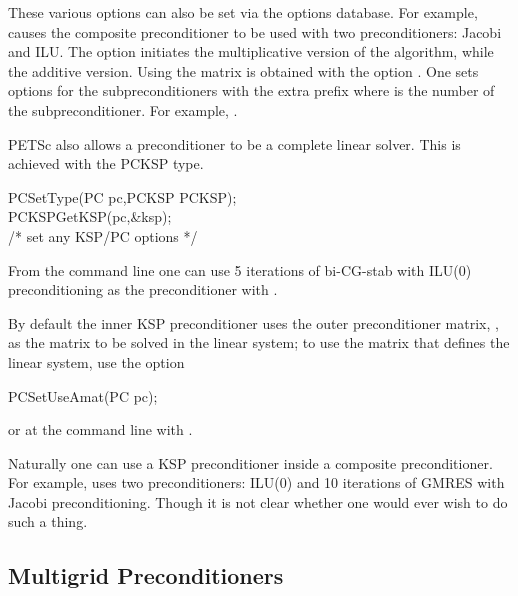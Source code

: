 These various options can also be set via the options database. For example,
    
 causes the composite preconditioner to be used with
two preconditioners: Jacobi and ILU. The option  
 initiates the multiplicative version of the algorithm,
while   the additive version. Using the 
matrix is obtained with the option .
 One sets options for the subpreconditioners with the
extra prefix  where  is the number of the subpreconditioner.
For example,  .


PETSc also allows a preconditioner to be a complete linear solver. This is
achieved with the PCKSP type.
\begin{tabbing}
  PCSetType(PC pc,PCKSP PCKSP);\\
  PCKSPGetKSP(pc,\&ksp);\\
   /* set any KSP/PC options */
\end{tabbing}
From the command line one can use 5 iterations of
bi-CG-stab with ILU(0) preconditioning as the preconditioner with
.

By default the inner KSP preconditioner uses the outer preconditioner matrix, ,
as the matrix to be solved in the linear system; to use the matrix that defines the linear system,  use the
option
\begin{tabbing}
  PCSetUseAmat(PC pc);
\end{tabbing}
or at the command line with . 

Naturally one can use a KSP preconditioner inside a composite preconditioner. For example,
uses two preconditioners: ILU(0) and 10 iterations of GMRES with Jacobi preconditioning. Though
it is not clear whether one would ever wish to do such a thing.

\subsection{Multigrid Preconditioners}  \label{sec_mg}

